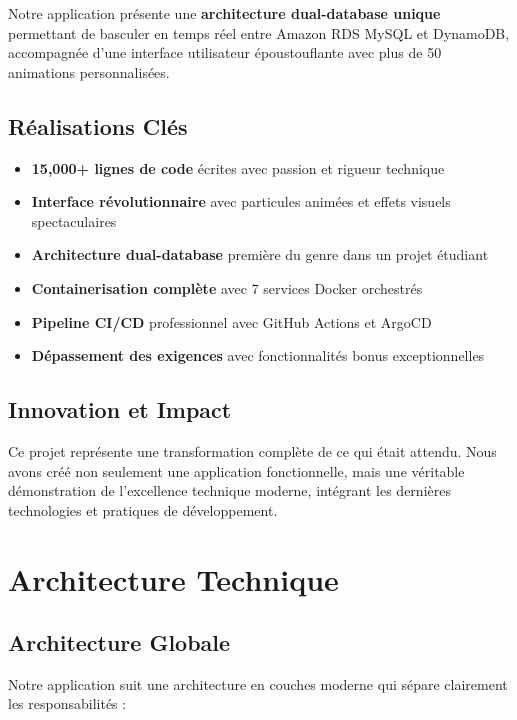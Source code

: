 \documentclass[12pt,a4paper]{report}
\begin{document}
Notre application présente une \textbf{architecture dual-database unique} permettant de basculer en temps réel entre Amazon RDS MySQL et DynamoDB, accompagnée d'une interface utilisateur époustouflante avec plus de 50 animations personnalisées.

\section{Réalisations Clés}

\begin{itemize}[label=\textcolor{primary}{$\checkmark$}]
    \item \textbf{15,000+ lignes de code} écrites avec passion et rigueur technique
    \item \textbf{Interface révolutionnaire} avec particules animées et effets visuels spectaculaires
    \item \textbf{Architecture dual-database} première du genre dans un projet étudiant
    \item \textbf{Containerisation complète} avec 7 services Docker orchestrés
    \item \textbf{Pipeline CI/CD} professionnel avec GitHub Actions et ArgoCD
    \item \textbf{Dépassement des exigences} avec fonctionnalités bonus exceptionnelles
\end{itemize}

\section{Innovation et Impact}

Ce projet représente une transformation complète de ce qui était attendu. Nous avons créé non seulement une application fonctionnelle, mais une véritable démonstration de l'excellence technique moderne, intégrant les dernières technologies et pratiques de développement.

\chapter{Architecture Technique}

\section{Architecture Globale}

Notre application suit une architecture en couches moderne qui sépare clairement les responsabilités :
\end{document}
